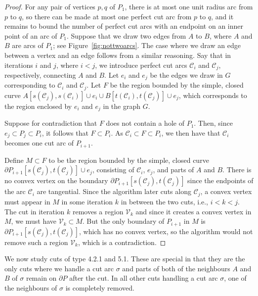 \documentclass{article}
\newcommand{\PP}{P}
\newcommand{\se}{\sigma}
\newcommand{\VV}{\mathcal V}
\newcommand{\cut}{\mathcal C}
\newcommand{\start}{s}
\newcommand{\terminal}{t}
\newcommand{\arcA}{A}
\newcommand{\arcB}{B}
\begin{document}
\begin{proof}
For any pair of vertices $p,q$ of $\PP_1$, there is at most one unit radius arc from $p$ to $q$, so there can be made at most one perfect cut arc from $p$ to $q$, and it remains to bound the number of perfect cut arcs with an endpoint on an inner point of an arc of $\PP_1$.
Suppose that we draw two edges from $\arcA$ to $\arcB$, where $\arcA$ and $\arcB$ are arcs of $\PP_1$; see Figure~\ref{fig:nottwoarcs}.
The case where we draw an edge between a vertex and an edge follows from a similar reasoning.
Say that in iterations $i$ and $j$, where $i<j$, we introduce perfect cut arcs $\cut_i$ and $\cut_j$, respectively, connecting $\arcA$ and $\arcB$.
Let $e_i$ and $e_j$ be the edges we draw in $G$ corresponding to $\cut_i$ and $\cut_j$.
Let $F$ be the region bounded by the simple, closed curve $\arcA[\start(\cut_j),\start(\cut_i)]\cup e_i\cup\arcB[\terminal(\cut_i),\terminal(\cut_j)]\cup e_j$, which corresponds to the region enclosed by $e_i$ and $e_j$ in the graph $G$.

Suppose for contradiction that $F$ does not contain a hole of $\PP_1$.
Then, since $e_j\subset\PP_j\subset\PP_i$, it follows that $F\subset\PP_i$.
As $\cut_i\subset F\subset\PP_i$, we then have that $\cut_i$ becomes one cut arc of $\PP_{i+1}$.

Define $M\subset F$ to be the region bounded by the simple, closed curve $\partial\PP_{i+1}[\start(\cut_j),\terminal(\cut_j)]\cup e_j$, consisting of $\cut_i$, $e_j$, and parts of $\arcA$ and $\arcB$.
There is no convex vertex on the boundary $\partial\PP_{i+1}[\start(\cut_j),\terminal(\cut_j)]$ since the endpoints of the arc $\cut_i$ are tangential.
Since the algorithm later cuts along $\cut_j$, a convex vertex must appear in $M$ in some iteration $k$ in between the two cuts, i.e., $i<k<j$.
The cut in iteration $k$ removes a region $\VV_k$ and since it creates a convex vertex in $M$, we must have $\VV_k\subset M$.
But the only boundary of $\PP_{i+1}$ in $M$ is $\partial\PP_{i+1}[\start(\cut_j),\terminal(\cut_j)]$, which has no convex vertex, so the algorithm would not remove such a region $\VV_k$, which is a contradiction.
\end{proof}

We now study cuts of type 4.2.1 and 5.1.
These are special in that they are the only cuts where we handle a cut arc $\sigma$ and parts of both of the neighbours $\arcA$ and $\arcB$ of $\se$ remain on $\partial\PP$ after the cut.
In all other cuts handling a cut arc $\sigma$, one of the neighbours of $\sigma$ is completely removed.
\end{document}
